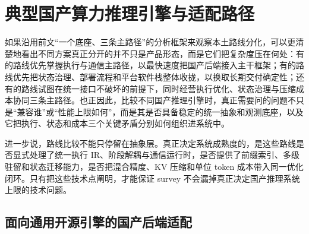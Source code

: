 \section{典型国产算力推理引擎与适配路径}

如果沿用前文“一个底座、三条主路径”的分析框架来观察本土路线分化，可以更清楚地看出不同方案真正分开的并不只是产品形态，而是它们把复杂度压在何处：有的路线优先掌握执行与通信主路径，以最快速度把国产后端接入主干框架；有的路线优先把状态治理、部署流程和平台软件栈整体收拢，以换取长期交付确定性；还有的路线试图在统一接口不破坏的前提下，同时经营执行优化、状态治理与压缩成本协同三条主路径。也正因此，比较不同国产推理引擎时，真正需要问的问题不只是“兼容谁”或“性能上限如何”，而是其是否具备稳定的统一抽象和观测底座，以及它把执行、状态和成本三个关键矛盾分别如何组织进系统中。

进一步说，路线比较不能只停留在抽象层。真正决定系统成熟度的，是这些路线是否显式处理了统一执行 IR、阶段解耦与通信运行时，是否提供了前缀索引、多级驻留和状态迁移能力，是否把混合精度、KV 压缩和单位 token 成本带入同一优化闭环。只有把这些技术点阐明，才能保证 survey 不会漏掉真正决定国产推理系统上限的技术问题。

\subsection{面向通用开源引擎的国产后端适配}

